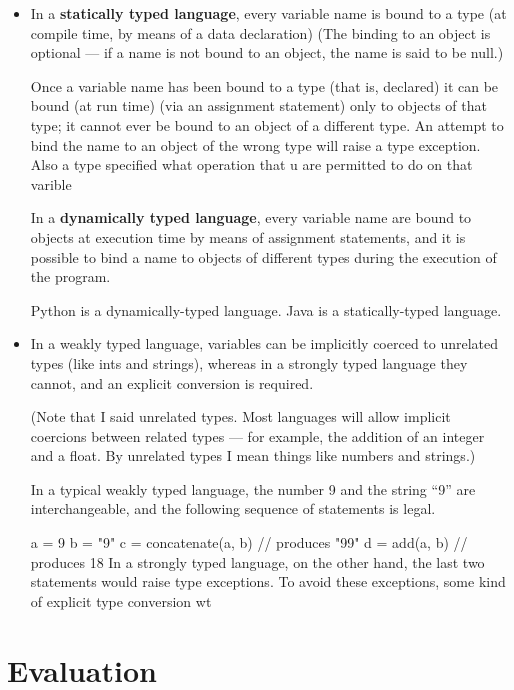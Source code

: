 \documentclass[10pt,oneside]{report}
\begin{document}
\begin{itemize}
\item
In a \textbf{statically typed language}, every variable name is bound 
to a type (at compile time, by means of a data declaration)
(The binding to an object is optional — if a name is not bound to an object, the name is said to be null.)

Once a variable name has been bound to a type (that is, declared) it can be
bound (at run time) (via an assignment statement) only to objects of that type; it cannot
ever be bound to an object of a different type. An attempt to bind the name to
an object of the wrong type will raise a type exception. Also
a type specified what operation that u are permitted to do on that varible

In a \textbf{dynamically typed language}, every variable name  are bound to objects at execution time by
  means of assignment statements, and it is possible to bind a name to objects
  of different types during the execution of the program.

  Python is a dynamically-typed language. 
  Java is a statically-typed language.

\item
In a weakly typed language, variables can be implicitly coerced to unrelated
types (like ints and strings), whereas in a strongly typed language they cannot, and an explicit
conversion is required. 

(Note that I said unrelated types. Most languages will
    allow implicit coercions between related types — for example, the addition
    of an integer and a float. By unrelated types I mean things like numbers
    and strings.)

In a typical weakly typed language, the number 9 and the
string “9” are interchangeable, and the following sequence of statements is
legal.

a  = 9
b = "9"
c = concatenate(a, b)  // produces "99"
d = add(a, b)          // produces 18
In a strongly typed language, on the other hand, the last two statements would
raise type exceptions. To avoid these exceptions, some kind of explicit type
conversion wt
  \end{itemize}  

\chapter{Evaluation}
\end{document}
